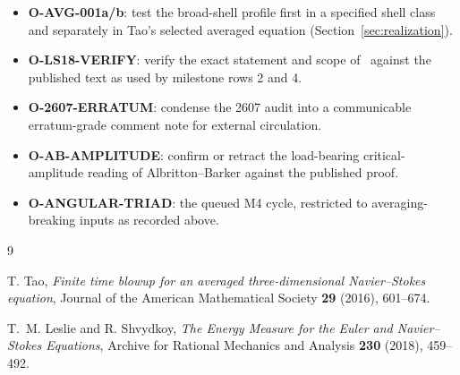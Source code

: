 \documentclass[11pt]{article}
\theoremstyle{remark}
\begin{document}
\begin{itemize}
\item \textbf{O-AVG-001a/b}: test the broad-shell profile first in a
specified shell class and separately in Tao's selected averaged equation
(Section~\ref{sec:realization}).
\item \textbf{O-LS18-VERIFY}: verify the exact statement and scope
of~\cite{LS18} against the published text as used by milestone rows 2
and 4.
\item \textbf{O-2607-ERRATUM}: condense the 2607 audit into a
communicable erratum-grade comment note for external circulation.
\item \textbf{O-AB-AMPLITUDE}: confirm or retract the load-bearing
critical-amplitude reading of Albritton--Barker against the published
proof.
\item \textbf{O-ANGULAR-TRIAD}: the queued M4 cycle, restricted to
averaging-breaking inputs as recorded above.
\end{itemize}

\begin{thebibliography}{9}

T. Tao,
\emph{Finite time blowup for an averaged three-dimensional
Navier--Stokes equation},
Journal of the American Mathematical Society \textbf{29} (2016),
601--674.

T.~M. Leslie and R. Shvydkoy,
\emph{The Energy Measure for the Euler and Navier--Stokes Equations},
Archive for Rational Mechanics and Analysis \textbf{230} (2018),
459--492.

\end{thebibliography}
\end{document}
